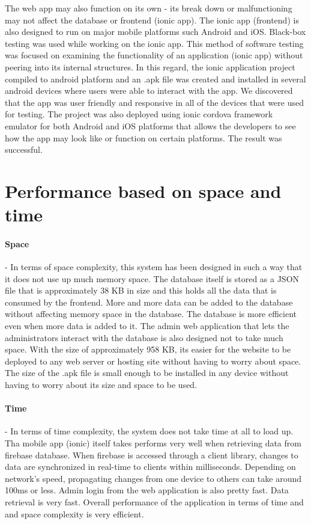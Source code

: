 The web app may also function on its own - its break down or malfunctioning may not affect the database or frontend (ionic app). The ionic app (frontend) is also designed to run on major mobile platforms such Android and iOS. Black-box testing was used while working on the ionic app. This method of software testing was focused on examining the functionality of an application (ionic app) without peering into its internal structures. In this regard, the ionic application project compiled to android platform and an .apk file was created and installed in several android devices where users were able to interact with the app. We discovered that the app was user friendly and responsive in all of the devices that were used for testing. The project was also deployed using ionic cordova framework emulator for both Android and iOS platforms that allows the developers to see how the app may look like or function on certain platforms. The result was successful. 

\section{Performance based on space and time}
\paragraph{Space}
- In terms of space complexity, this system has been designed in such a way that it does not use up much memory space. The database itself is stored as a JSON file that is approximately 38 KB in size and this holds all the data that is consumed by the frontend. More and more data can be added to the database without affecting memory space in the database. The database is more efficient even when more data is added to it. 
The admin web application that lets the administrators interact with the database is also designed not to take much space. With the size of approximately 958 KB, its easier for the website to be deployed to any web server or hosting site without having to worry about space. 
The size of the .apk file is small enough to be installed in any device without having to worry about its size and space to be used.

\paragraph{Time}
- In terms of time complexity, the system does not take time at all to load up. Tha mobile app (ionic) itself takes performs very well when retrieving data from firebase database. When firebase is accessed through a client library, changes to data are synchronized in real-time to clients within milliseconds. Depending on network’s speed, propagating changes from one device to others can take around 100ms or less.
Admin login from the web application is also pretty fast. Data retrieval is very fast. Overall performance of the application in terms of time and and space complexity is very efficient.

